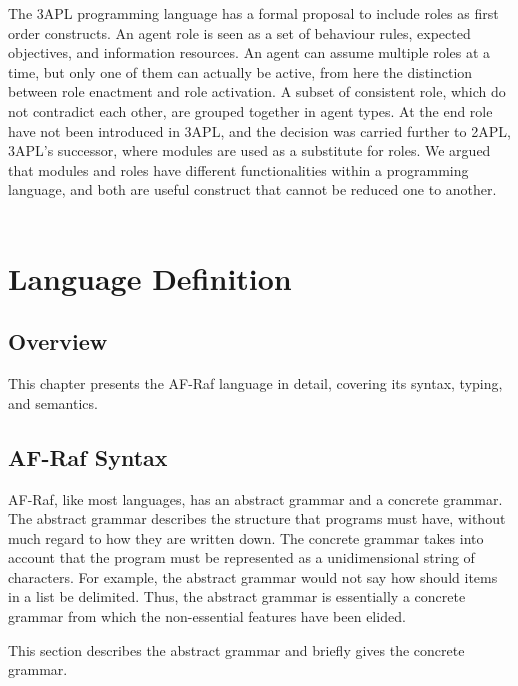 \documentclass[a4paper,12pt,oneside,fleqn]{book} %
\begin{document}
The 3APL programming language\cite{DBLP:conf/aose/DastaniRHDM04} has a
formal proposal to include roles as first order constructs. An agent role
is seen as a set of behaviour rules, expected objectives, and information
resources. An agent can assume multiple roles at a time, but only one of
them can actually be active, from here the distinction between role
enactment and role activation. A subset of consistent role, which do not
contradict each other, are grouped together in agent types. At the end role
have not been introduced in 3APL, and the decision was carried further to
2APL\cite{DBLP:journals/aamas/Dastani08}, 3APL's successor, where modules
are used as a substitute for roles. We argued that modules and roles have
different functionalities within a programming language, and both are
useful construct that cannot be reduced one to another.\\~\\



\chapter{Language Definition}\label{ch:langdef} %

\section{Overview}\label{sec:langdef.overview} %

This chapter presents the AF-Raf language in detail, covering its syntax,
typing, and semantics.

\section{AF-Raf Syntax} %

AF-Raf, like most languages, has an abstract grammar and a concrete
grammar. The abstract grammar describes the structure that programs must
have, without much regard to how they are written down. The concrete
grammar takes into account that the program must be represented as a
unidimensional string of characters. For example, the abstract grammar
would not say how should items in a list be delimited. Thus, the abstract
grammar is essentially a concrete grammar from which the non-essential
features have been elided.

This section describes the abstract grammar and briefly gives the concrete
grammar.
\end{document}
